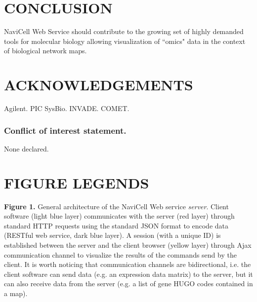 \documentclass[a4,center,fleqn]{NAR}
\begin{document}
\section{CONCLUSION}

NaviCell Web Service should contribute to the growing set of highly demanded tools for molecular biology allowing visualization of ``omics" data in the context of biological network maps.

\section{ACKNOWLEDGEMENTS}

Agilent. PIC SysBio. INVADE. COMET.

\subsubsection{Conflict of interest statement.} None declared.
\newpage



\section{FIGURE LEGENDS}

\textbf{Figure 1.} General architecture of the NaviCell Web service
\emph{server}. Client software (light blue layer) communicates with the server
(red layer) through standard HTTP requests using the standard JSON format to
encode data (RESTful web service, dark blue layer). A session (with a unique ID)
is established between the server and the client browser (yellow layer) through
Ajax communication channel to visualize the results of the commands send by the
client. It is worth noticing that communication channels are bidirectional, i.e.
the client software can send data (e.g. an expression data matrix) to the
server, but it can also receive data from the server (e.g. a list of gene HUGO
codes contained in a map).
\end{document}
